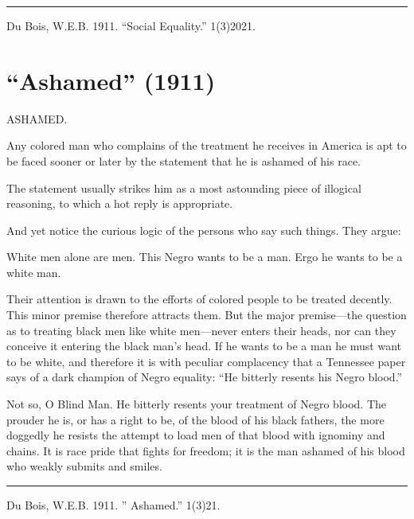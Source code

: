 \documentclass[letterpaper,10pt,english]{jupyterBook}
\begin{document}
\bigskip\hrule\bigskip


\sphinxAtStartPar
{} Du Bois, W.E.B. 1911. “Social Equality.”  1(3)20\sphinxhyphen{}21.


\section{“Ashamed” (1911)}
\label{\detokenize{Volumes/01/03/ashamed:ashamed-1911}}\label{\detokenize{Volumes/01/03/ashamed::doc}}
\sphinxAtStartPar
ASHAMED.

\sphinxAtStartPar
Any colored man who complains of the treatment he receives in America is apt to be faced sooner or later by the statement that he is ashamed of his race.

\sphinxAtStartPar
The statement usually strikes him as a most astounding piece of illogical reasoning, to which a hot reply is appropriate.

\sphinxAtStartPar
And yet notice the curious logic of  the persons who say such things. They argue:

\sphinxAtStartPar
White men alone are men. This Negro wants to be a man. Ergo he wants to be a white man.

\sphinxAtStartPar
Their attention is drawn to the efforts of colored people to be treated decently. This minor premise therefore attracts them. But the major premise—the question as to treating black men like white men—never enters their heads, nor can they conceive it entering the black man’s head. If he wants to be a man he must want to be white, and therefore it is with peculiar complacency that a Tennessee paper says of a dark champion of Negro equality: “He bitterly resents his Negro blood.”

\sphinxAtStartPar
Not so, O Blind Man. He bitterly resents your treatment of Negro blood. The prouder he is, or has a right to be, of the blood of his black fathers, the more doggedly he resists the attempt to load men of that blood with ignominy and chains. It is race pride that fights for freedom; it is the man ashamed of his blood who weakly submits and smiles.


\bigskip\hrule\bigskip


\sphinxAtStartPar
{} Du Bois, W.E.B. 1911. ” Ashamed.”  1(3)21.
\end{document}
